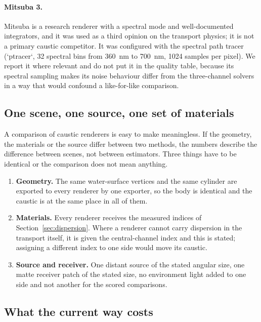 \paragraph{Mitsuba 3.} Mitsuba \cite{jakob2022} is a research renderer with a
spectral mode and well-documented integrators, and it was used as a third opinion on the transport physics; it is not a primary caustic competitor.
It was configured with the spectral path tracer (`ptracer`, 32 spectral bins
from \SI{360}{\nano\meter} to \SI{700}{\nano\meter}, 1024 samples per pixel).
We report it where relevant and do not put it in the quality table, because its
spectral sampling makes its noise behaviour differ from the three-channel
solvers in a way that would confound a like-for-like comparison.

\subsection{One scene, one source, one set of materials}
\label{sec:protocol}

A comparison of caustic renderers is easy to make meaningless. If the geometry,
the materials or the source differ between two methods, the numbers describe the difference between scenes, not between estimators. Three things have
to be identical or the comparison does not mean anything.

\begin{enumerate}
\item \textbf{Geometry.} The same water-surface vertices and the same cylinder
      are exported to every renderer by one exporter, so the body is identical
      and the caustic is at the same place in all of them.
\item \textbf{Materials.} Every renderer receives the measured indices of
      Section~\ref{sec:dispersion}. Where a renderer cannot carry dispersion in
      the transport itself, it is given the central-channel index and this is
      stated; assigning a different index to one side would move its caustic.
\item \textbf{Source and receiver.} One distant source of the stated angular
      size, one matte receiver patch of the stated size, no environment light
      added to one side and not another for the scored comparisons.
\end{enumerate}

\subsection{What the current way costs}
\label{sec:current-cost}

